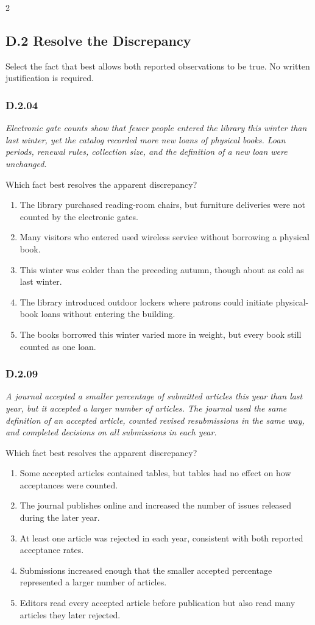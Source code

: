 \documentclass[10pt]{extarticle}
\newcommand{\choice}[1]{\item #1}
\newcommand{\bankitem}[1]{\subsubsection*{#1}}
\begin{document}
\begin{multicols}{2}
\subsection*{D.2 Resolve the Discrepancy}
Select the fact that best allows both reported observations to be true. No written justification is required.
\begin{samepage}
\bankitem{D.2.04}
\emph{Electronic gate counts show that fewer people entered the library this winter than last winter, yet the catalog recorded more new loans of physical books. Loan periods, renewal rules, collection size, and the definition of a new loan were unchanged.}

Which fact best resolves the apparent discrepancy?
\begin{enumerate}[label=(\alph*)]
  \choice{The library purchased reading-room chairs, but furniture deliveries were not counted by the electronic gates.}
  \choice{Many visitors who entered used wireless service without borrowing a physical book.}
  \choice{This winter was colder than the preceding autumn, though about as cold as last winter.}
  \choice{The library introduced outdoor lockers where patrons could initiate physical-book loans without entering the building.}
  \choice{The books borrowed this winter varied more in weight, but every book still counted as one loan.}
\end{enumerate}
\end{samepage}\par\smallskip
\begin{samepage}
\bankitem{D.2.09}
\emph{A journal accepted a smaller percentage of submitted articles this year than last year, but it accepted a larger number of articles. The journal used the same definition of an accepted article, counted revised resubmissions in the same way, and completed decisions on all submissions in each year.}

Which fact best resolves the apparent discrepancy?
\begin{enumerate}[label=(\alph*)]
  \choice{Some accepted articles contained tables, but tables had no effect on how acceptances were counted.}
  \choice{The journal publishes online and increased the number of issues released during the later year.}
  \choice{At least one article was rejected in each year, consistent with both reported acceptance rates.}
  \choice{Submissions increased enough that the smaller accepted percentage represented a larger number of articles.}
  \choice{Editors read every accepted article before publication but also read many articles they later rejected.}
\end{enumerate}
\end{samepage}\par\smallskip

\end{multicols}
\end{document}
